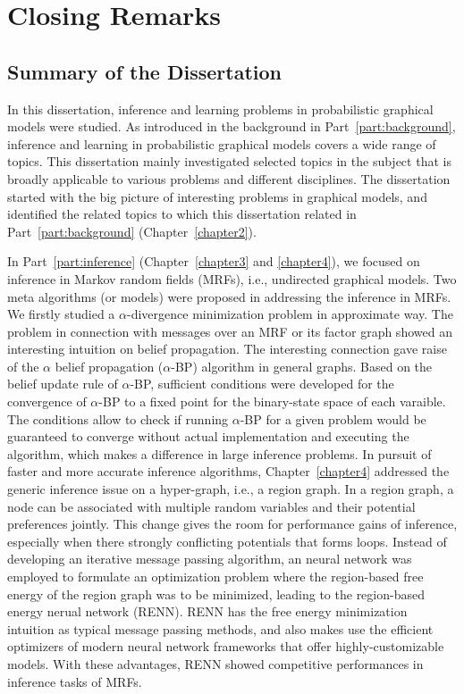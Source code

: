 \chapter{Closing Remarks}
\label{chapter9}

\section{Summary of the Dissertation}
In this dissertation, inference and learning problems in probabilistic graphical models were studied. As introduced in the background in Part~\ref{part:background}, inference and learning in probabilistic graphical models covers a wide range of topics. This dissertation mainly investigated selected topics in the subject that is broadly applicable to various problems and different disciplines. The dissertation started with the big picture of interesting problems in graphical models, and identified the related topics to which this dissertation related in Part~\ref{part:background} (Chapter~\ref{chapter2}).

In Part~\ref{part:inference} (Chapter~\ref{chapter3} and \ref{chapter4}), we focused on inference in Markov random fields (MRFs), i.e., undirected graphical models. Two meta algorithms (or models) were proposed in addressing the inference in MRFs. We firstly studied a $\alpha$-divergence minimization problem in approximate way. The problem in connection with messages over an MRF or its factor graph showed an interesting intuition on belief propagation. The interesting connection gave raise of the $\alpha$ belief propagation ($\alpha$-BP) algorithm in general graphs. Based on the belief update rule of $\alpha$-BP, sufficient conditions were developed for the convergence of $\alpha$-BP to a fixed point for the binary-state space of each varaible. The conditions allow to check if running $\alpha$-BP for a given problem would be guaranteed to converge without actual implementation and executing the algorithm, which makes a difference in large inference problems. In pursuit of faster and more accurate inference algorithms, Chapter~\ref{chapter4} addressed the generic inference issue on a hyper-graph, i.e., a region graph. In a region graph, a node can be associated with multiple random variables and their potential preferences jointly. This change gives the room for performance gains of inference, especially when there strongly conflicting potentials that forms loops. Instead of developing an iterative message passing algorithm, an neural network was employed to formulate an optimization problem where the region-based free energy of the region graph was to be minimized, leading to the region-based energy nerual network (RENN). RENN has the free energy minimization intuition as typical message passing methods, and also makes use the efficient optimizers of modern neural network frameworks that offer highly-customizable models. With these advantages, RENN showed competitive performances in inference tasks of MRFs.

